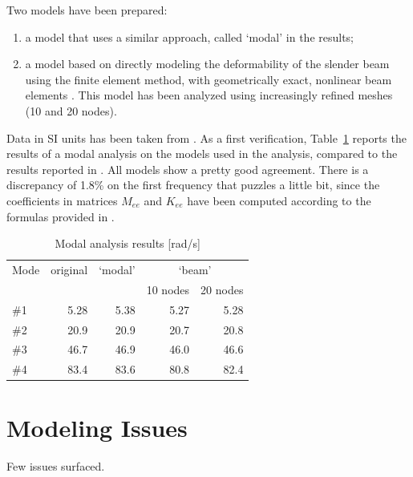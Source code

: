 \documentclass[11pt, a4paper, subeqn]{article}
\begin{document}
Two models have been prepared:
\begin{enumerate}
\item a model that uses a similar approach, called `modal' in the results;
\item a model based on directly modeling the deformability of the slender
beam using the finite element method, with geometrically exact, nonlinear 
beam elements \cite{FV-AIAA}.
This model has been analyzed using increasingly refined meshes
(10 and 20 nodes).
\end{enumerate}

Data in SI units has been taken from \cite{MACLEAN-2007}.
As a first verification, Table~\ref{tab:modes} reports the results
of a modal analysis on the models used in the analysis,
compared to the results reported in \cite{MACLEAN-2007}.
All models show a pretty good agreement.
There is a discrepancy of 1.8\% on the first frequency that puzzles
a little bit, since the coefficients in matrices $M_{ee}$ and $K_{ee}$
have been computed according to the formulas provided in \cite{MACLEAN-2007}.


\begin{table}
\centering
\caption{Modal analysis results [rad/s]}
\label{tab:modes}
\begin{tabular}{lrrrr}
\hline
Mode & original & `modal' & \multicolumn{2}{c}{`beam'} \\
& & & 10 nodes & 20 nodes \\
\hline\hline
\#1	& 5.28	& 5.38	& 5.27	& 5.28 \\
\#2	& 20.9	& 20.9	& 20.7	& 20.8 \\
\#3	& 46.7	& 46.9	& 46.0	& 46.6 \\
\#4	& 83.4	& 83.6	& 80.8	& 82.4 \\
\hline
\end{tabular}
\end{table}

\section*{Modeling Issues}
Few issues surfaced.
\end{document}

